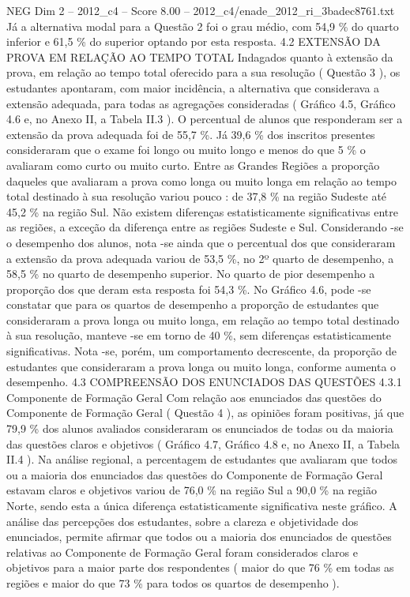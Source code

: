 \begin{textsample}{NEG Dim 2 – 2012\_c4 – Score 8.00 – 2012\_c4/enade\_2012\_ri\_3badec8761.txt}
Já a alternativa modal para a Questão 2 foi o grau médio, com 54,9 \% do quarto inferior e 61,5 \% do superior optando por esta resposta. 4.2 EXTENSÃO DA PROVA EM RELAÇÃO AO TEMPO TOTAL Indagados quanto à extensão da prova, em relação ao tempo total oferecido para a sua resolução ( Questão 3 ), os estudantes apontaram, com maior incidência, a alternativa que considerava a extensão adequada, para todas as agregações consideradas ( Gráfico 4.5, Gráfico 4.6 e, no Anexo II, a Tabela II.3 ).
O percentual de alunos que responderam ser a extensão da prova adequada foi de 55,7 \%.
Já 39,6 \% dos inscritos presentes consideraram que o exame foi longo ou muito longo e menos do que 5 \% o avaliaram como curto ou muito curto.
Entre as Grandes Regiões a proporção daqueles que avaliaram a prova como longa ou muito longa em relação ao tempo total destinado à sua resolução variou pouco : de 37,8 \% na região Sudeste até 45,2 \% na região Sul.
Não existem diferenças estatisticamente significativas entre as regiões, a exceção da diferença entre as regiões Sudeste e Sul.
Considerando -se o desempenho dos alunos, nota -se ainda que o percentual dos que consideraram a extensão da prova adequada variou de 53,5 \%, no 2º quarto de desempenho, a 58,5 \% no quarto de desempenho superior.
No quarto de pior desempenho a proporção dos que deram esta resposta foi 54,3 \%.
No Gráfico 4.6, pode -se constatar que para os quartos de desempenho a proporção de estudantes que consideraram a prova longa ou muito longa, em relação ao tempo total destinado à sua resolução, manteve -se em torno de 40 \%, sem diferenças estatisticamente significativas.
Nota -se, porém, um comportamento decrescente, da proporção de estudantes que consideraram a prova longa ou muito longa, conforme aumenta o desempenho. 4.3 COMPREENSÃO DOS ENUNCIADOS DAS QUESTÕES 4.3.1 Componente de Formação Geral Com relação aos enunciados das questões do Componente de Formação Geral ( Questão 4 ), as opiniões foram positivas, já que 79,9 \% dos alunos avaliados consideraram os enunciados de todas ou da maioria das questões claros e objetivos ( Gráfico 4.7, Gráfico 4.8 e, no Anexo II, a Tabela II.4 ).
Na análise regional, a percentagem de estudantes que avaliaram que todos ou a maioria dos enunciados das questões do Componente de Formação Geral estavam claros e objetivos variou de 76,0 \% na região Sul a 90,0 \% na região Norte, sendo esta a única diferença estatisticamente significativa neste gráfico.
A análise das percepções dos estudantes, sobre a clareza e objetividade dos enunciados, permite afirmar que todos ou a maioria dos enunciados de questões relativas ao Componente de Formação Geral foram considerados claros e objetivos para a maior parte dos respondentes ( maior do que 76 \% em todas as regiões e maior do que 73 \% para todos os quartos de desempenho ).

\end{textsample}
